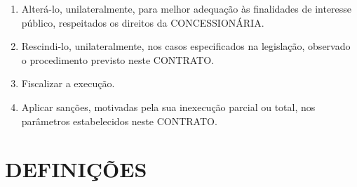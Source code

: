 \documentclass[a4paper,11pt]{report} %
\begin{document}
\begin{enumerate}
\begin{enumerate}[label*=\arabic*.]
\item \label{itm:Z4JK} Alterá-lo, unilateralmente, para melhor adequação às finalidades de interesse público, respeitados os direitos da CONCESSIONÁRIA.
\item \label{itm:PK35} Rescindi-lo, unilateralmente, nos casos especificados na legislação, observado o procedimento previsto neste CONTRATO.
\item \label{itm:CQ8W} Fiscalizar a execução.
\item \label{itm:P344} Aplicar sanções, motivadas pela sua inexecução parcial ou total, nos parâmetros estabelecidos neste CONTRATO.
\end{enumerate}

\end{enumerate}

\section{DEFINIÇÕES}
\label{sec:Q7MS}
\end{document}
